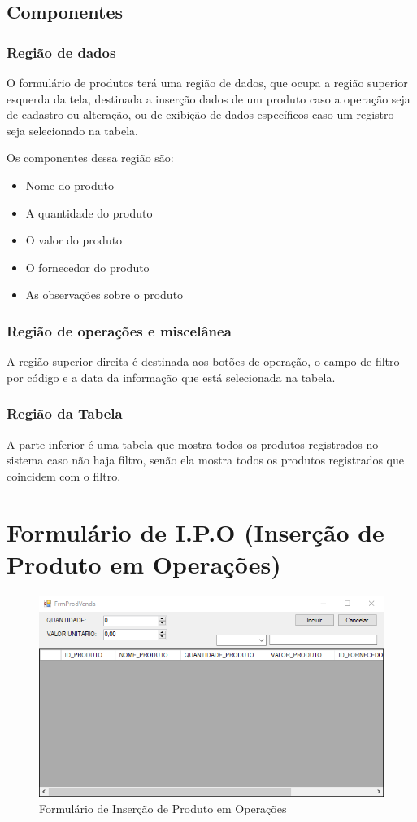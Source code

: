 \documentclass[
	article,			%
	12pt,				%
	oneside,			%
	a4paper,			%
	english,			%
	brazil,				%
	sumario=tradicional
	]{abntex2}
\begin{document}
	\subsection{Componentes}
	\subsubsection{Região de dados}
	O formulário de produtos terá uma região de dados, que ocupa a região superior esquerda da tela, destinada a inserção dados de um produto caso a operação seja de cadastro ou alteração, ou de exibição de dados específicos caso um registro seja selecionado na tabela.
	
	Os componentes dessa região são:
	\begin{itemize}\itemsep1.5pt
		\item Nome do produto
		\item A quantidade do produto
		\item O valor do produto
		\item O fornecedor do produto
		\item As observações sobre o produto
	\end{itemize}	
	\subsubsection{Região de operações e miscelânea}
	A região superior direita é destinada aos botões de operação, o campo de filtro por código e a data da informação que está selecionada na tabela.
	\subsubsection{Região da Tabela}
	A parte inferior é uma tabela que mostra todos os produtos registrados no sistema caso não haja filtro, senão ela mostra todos os produtos registrados que coincidem com o filtro.
\newpage
	\section{Formulário de I.P.O (Inserção de Produto em Operações)}
	\begin{figure}[!htb]
		\centering
		\includegraphics[scale=0.9]{../Figuras/FrmProdVenda.png}
		\caption{Formulário de Inserção de Produto em Operações}
	\end{figure}
\end{document}
